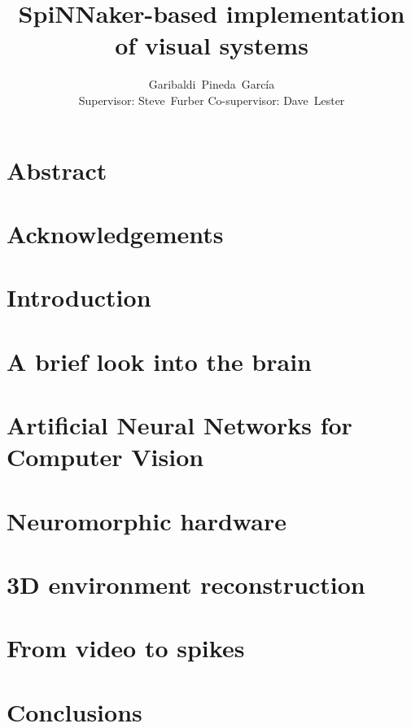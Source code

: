 \documentclass[11pt,a4paper]{memoir}
\title{SpiNNaker-based implementation of visual systems}
\author{Garibaldi~Pineda~García \\ Supervisor: Steve~Furber Co-supervisor: Dave~Lester}
\date{}
\begin{document}
  \thispagestyle{empty}
  

  \cleardoublepage
  \tableofcontents
  \cleardoublepage

\chapter*{Abstract}
\label{abstract}


\chapter*{Acknowledgements}
\label{acknowledgements}


\pagestyle{ruled}

  \chapter{Introduction}
  
  \label{chp:intro}

  \chapter{A brief look into the brain}
  \label{chp:brain}
  

  \chapter{Artificial Neural Networks for Computer Vision}
  \label{chp:vision}
  

  \chapter{Neuromorphic hardware}
  \label{chp:neuro-hw}
  

  \chapter{3D environment reconstruction}
  \label{chp:reconstruction}
  


  \chapter{From video to spikes}
  \label{chp:img2spk}
  

  \chapter{Conclusions}
  \label{chp:conclusions}
  

  \printbibliography
\end{document}
